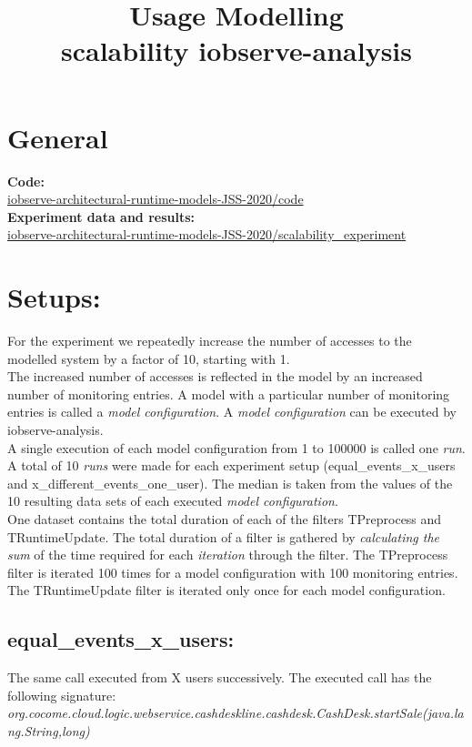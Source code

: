 \documentclass[10pt,a4paper]{article}
\begin{document}
	\title{Usage Modelling\\scalability iobserve-analysis}
	\date{}
	\maketitle
	
	\section{General}
	\textbf{Code:}\\
	\href{https://github.com/research-iobserve/iobserve-architectural-runtime-models-JSS-2020/tree/master/code}{iobserve-architectural-runtime-models-JSS-2020/code}\\
	\textbf{Experiment data and results:}\\ \href{https://github.com/research-iobserve/iobserve-architectural-runtime-models-JSS-2020/tree/master/scalability_experiment}{iobserve-architectural-runtime-models-JSS-2020/scalability\_experiment}
	
	\section{Setups:}
	For the experiment we repeatedly increase the number of accesses to the modelled system by a factor of 10, starting with 1.\\
	The increased number of accesses is reflected in the model by an increased number of monitoring entries.
	A model with a particular number of monitoring entries is called a \emph{model configuration}.
	A \emph{model configuration} can be executed by iobserve-analysis.\\
	A single execution of each model configuration from 1 to 100000 is called one \emph{run}.
	A total of 10 \emph{runs} were made for each experiment setup (equal\_events\_x\_users and x\_different\_events\_one\_user). 
	The median is taken from the values of the 10 resulting data sets of each executed \emph{model configuration}.\\
	One dataset contains the total duration of each of the filters TPreprocess and TRuntimeUpdate. 
	The total duration of a filter is gathered by \emph{calculating the sum} of the time required for each \emph{iteration} through the filter.
	The TPreprocess filter is iterated 100 times for a model configuration with 100 monitoring entries.
	The TRuntimeUpdate filter is iterated only once for each model configuration.
	
	\subsection{equal\_events\_x\_users:}
	The same call executed from X users successively. The executed call has the following signature:\\ \emph{org.cocome.cloud.logic.webservice.cashdeskline.cashdesk.CashDesk.startSale(java.lang.String,long)}
	
\end{document}
